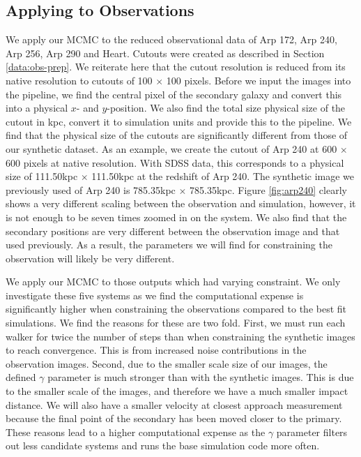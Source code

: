 \subsection{Applying to Observations}
\noindent We apply our MCMC to the reduced observational data of Arp 172, Arp 240, Arp 256, Arp 290 and Heart. Cutouts were created as described in Section \ref{data:obs-prep}. We reiterate here that the cutout resolution is reduced from its native resolution to cutouts of 100 $\times$ 100 pixels. Before we input the images into the pipeline, we find the central pixel of the secondary galaxy and convert this into a physical $x$- and $y$-position. We also find the total size physical size of the cutout in kpc, convert it to simulation units and provide this to the pipeline. We find that the physical size of the cutouts are significantly different from those of our synthetic dataset. As an example, we create the cutout of Arp 240 at 600 $\times$ 600 pixels at native resolution. With SDSS data, this corresponds to a physical size of 111.50kpc $\times$ 111.50kpc at the redshift of Arp 240. The synthetic image we previously used of Arp 240 is 785.35kpc $\times$ 785.35kpc. Figure \ref{fig:arp240} clearly shows a very different scaling between the observation and simulation, however, it is not enough to be seven times zoomed in on the system. We also find that the secondary positions are very different between the observation image and that used previously. As a result, the parameters we will find for constraining the observation will likely be very different. 

We apply our MCMC to those outputs which had varying constraint. We only investigate these five systems as we find the computational expense is significantly higher when constraining the observations compared to the best fit simulations. We find the reasons for these are two fold. First, we must run each walker for twice the number of steps than when constraining the synthetic images to reach convergence. This is from increased noise contributions in the observation images. Second, due to the smaller scale size of our images, the defined $\gamma$ parameter is much stronger than with the synthetic images. This is due to the smaller scale of the images, and therefore we have a much smaller impact distance. We will also have a smaller velocity at closest approach measurement because the final point of the secondary has been moved closer to the primary. These reasons lead to a higher computational expense as the $\gamma$ parameter filters out less candidate systems and runs the base simulation code more often.

